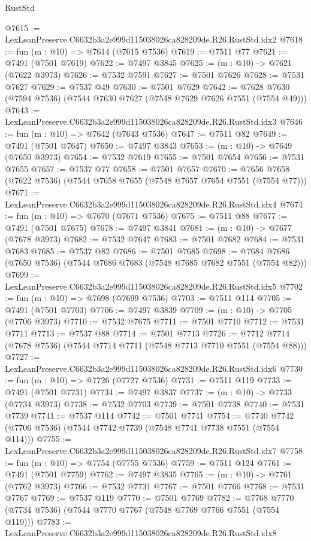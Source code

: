 \begin{lexlean}{RustStd}
\begin{coremodule}
@7615 := LexLeanPreserve.C6632b3a2e999d115038026ca828209de.R26.RustStd.idx2
@7618 := fun (m : @10) => @7614 (@7615 @7536)
@7619 := @7511 @77
@7621 := @7491 (@7501 @7619)
@7622 := @7497 @3845
@7625 := (m : @10) -> @7621 (@7622 @3973)
@7626 := @7532 @7591
@7627 := @7501 @7626
@7628 := @7531 @7627
@7629 := @7537 @49
@7630 := @7501 @7629
@7642 := @7628 @7630 (@7594 @7536) (@7544 @7630 @7627 (@7548 @7629 @7626 @7551 (@7554 @49)))
@7643 := LexLeanPreserve.C6632b3a2e999d115038026ca828209de.R26.RustStd.idx3
@7646 := fun (m : @10) => @7642 (@7643 @7536)
@7647 := @7511 @82
@7649 := @7491 (@7501 @7647)
@7650 := @7497 @3843
@7653 := (m : @10) -> @7649 (@7650 @3973)
@7654 := @7532 @7619
@7655 := @7501 @7654
@7656 := @7531 @7655
@7657 := @7537 @77
@7658 := @7501 @7657
@7670 := @7656 @7658 (@7622 @7536) (@7544 @7658 @7655 (@7548 @7657 @7654 @7551 (@7554 @77)))
@7671 := LexLeanPreserve.C6632b3a2e999d115038026ca828209de.R26.RustStd.idx4
@7674 := fun (m : @10) => @7670 (@7671 @7536)
@7675 := @7511 @88
@7677 := @7491 (@7501 @7675)
@7678 := @7497 @3841
@7681 := (m : @10) -> @7677 (@7678 @3973)
@7682 := @7532 @7647
@7683 := @7501 @7682
@7684 := @7531 @7683
@7685 := @7537 @82
@7686 := @7501 @7685
@7698 := @7684 @7686 (@7650 @7536) (@7544 @7686 @7683 (@7548 @7685 @7682 @7551 (@7554 @82)))
@7699 := LexLeanPreserve.C6632b3a2e999d115038026ca828209de.R26.RustStd.idx5
@7702 := fun (m : @10) => @7698 (@7699 @7536)
@7703 := @7511 @114
@7705 := @7491 (@7501 @7703)
@7706 := @7497 @3839
@7709 := (m : @10) -> @7705 (@7706 @3973)
@7710 := @7532 @7675
@7711 := @7501 @7710
@7712 := @7531 @7711
@7713 := @7537 @88
@7714 := @7501 @7713
@7726 := @7712 @7714 (@7678 @7536) (@7544 @7714 @7711 (@7548 @7713 @7710 @7551 (@7554 @88)))
@7727 := LexLeanPreserve.C6632b3a2e999d115038026ca828209de.R26.RustStd.idx6
@7730 := fun (m : @10) => @7726 (@7727 @7536)
@7731 := @7511 @119
@7733 := @7491 (@7501 @7731)
@7734 := @7497 @3837
@7737 := (m : @10) -> @7733 (@7734 @3973)
@7738 := @7532 @7703
@7739 := @7501 @7738
@7740 := @7531 @7739
@7741 := @7537 @114
@7742 := @7501 @7741
@7754 := @7740 @7742 (@7706 @7536) (@7544 @7742 @7739 (@7548 @7741 @7738 @7551 (@7554 @114)))
@7755 := LexLeanPreserve.C6632b3a2e999d115038026ca828209de.R26.RustStd.idx7
@7758 := fun (m : @10) => @7754 (@7755 @7536)
@7759 := @7511 @124
@7761 := @7491 (@7501 @7759)
@7762 := @7497 @3835
@7765 := (m : @10) -> @7761 (@7762 @3973)
@7766 := @7532 @7731
@7767 := @7501 @7766
@7768 := @7531 @7767
@7769 := @7537 @119
@7770 := @7501 @7769
@7782 := @7768 @7770 (@7734 @7536) (@7544 @7770 @7767 (@7548 @7769 @7766 @7551 (@7554 @119)))
@7783 := LexLeanPreserve.C6632b3a2e999d115038026ca828209de.R26.RustStd.idx8

\end{coremodule}
\end{lexlean}
